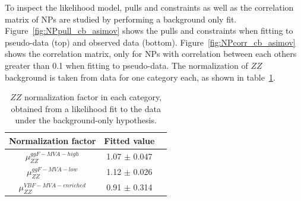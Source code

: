 To inspect the likelihood model, pulls and constraints as well as the correlation matrix of NPs are studied by performing a background only fit.
Figure~\ref{fig:NPpull_cb_asimov} shows the pulls and constraints when fitting to pseudo-data (top) and observed data (bottom).
Figure~\ref{fig:NPcorr_cb_asimov} shows the correlation matrix, only for NPs with correlation between each others greater than 0.1 when fitting to pseudo-data.
The normalization of $ZZ$ background is taken from data for one category each, as shown in table~\ref{tab:muZZ_bonly_dnn}.

\begin{table}[htbp]
  \centering
  \caption{$ZZ$ normalization factor in each category, obtained from a likelihood fit to the data under the background-only hypothesis.}
  \label{tab:muZZ_bonly_dnn}
  \small
  \begin{spacing}{1.0}
  \begin{tabular}{ccc}
    \toprule
    Normalization factor  & Fitted value \\
    \midrule
    $\mu_{ZZ}^{ggF-MVA-high}$  & 1.07 $\pm$ 0.047 \\
    \hline
    $\mu_{ZZ}^{ggF-MVA-low}$   & 1.12 $\pm$ 0.026 \\
    \hline
    $\mu_{ZZ}^{VBF-MVA-enriched}$  & 0.91 $\pm$ 0.314 \\
    \bottomrule
  \end{tabular}
  \end{spacing}
\end{table}

